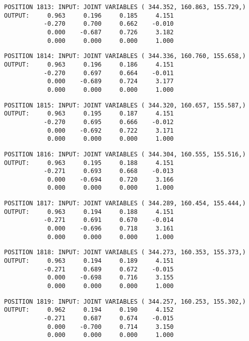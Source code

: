 \begin{verbatim}
POSITION 1813: INPUT: JOINT VARIABLES ( 344.352, 160.863, 155.729,)
OUTPUT:     0.963     0.196     0.185     4.151
           -0.270     0.700     0.662    -0.010
            0.000    -0.687     0.726     3.182
            0.000     0.000     0.000     1.000
\end{verbatim} \pagebreak[1]\begin{verbatim}
POSITION 1814: INPUT: JOINT VARIABLES ( 344.336, 160.760, 155.658,)
OUTPUT:     0.963     0.196     0.186     4.151
           -0.270     0.697     0.664    -0.011
            0.000    -0.689     0.724     3.177
            0.000     0.000     0.000     1.000
\end{verbatim} \pagebreak[1]\begin{verbatim}
POSITION 1815: INPUT: JOINT VARIABLES ( 344.320, 160.657, 155.587,)
OUTPUT:     0.963     0.195     0.187     4.151
           -0.270     0.695     0.666    -0.012
            0.000    -0.692     0.722     3.171
            0.000     0.000     0.000     1.000
\end{verbatim} \pagebreak[1]\begin{verbatim}
POSITION 1816: INPUT: JOINT VARIABLES ( 344.304, 160.555, 155.516,)
OUTPUT:     0.963     0.195     0.188     4.151
           -0.271     0.693     0.668    -0.013
            0.000    -0.694     0.720     3.166
            0.000     0.000     0.000     1.000
\end{verbatim} \pagebreak[1]\begin{verbatim}
POSITION 1817: INPUT: JOINT VARIABLES ( 344.289, 160.454, 155.444,)
OUTPUT:     0.963     0.194     0.188     4.151
           -0.271     0.691     0.670    -0.014
            0.000    -0.696     0.718     3.161
            0.000     0.000     0.000     1.000
\end{verbatim} \pagebreak[1]\begin{verbatim}
POSITION 1818: INPUT: JOINT VARIABLES ( 344.273, 160.353, 155.373,)
OUTPUT:     0.963     0.194     0.189     4.151
           -0.271     0.689     0.672    -0.015
            0.000    -0.698     0.716     3.155
            0.000     0.000     0.000     1.000
\end{verbatim} \pagebreak[1]\begin{verbatim}
POSITION 1819: INPUT: JOINT VARIABLES ( 344.257, 160.253, 155.302,)
OUTPUT:     0.962     0.194     0.190     4.152
           -0.271     0.687     0.674    -0.015
            0.000    -0.700     0.714     3.150
            0.000     0.000     0.000     1.000
\end{verbatim} \pagebreak[1]\begin{verbatim}

\end{verbatim}
